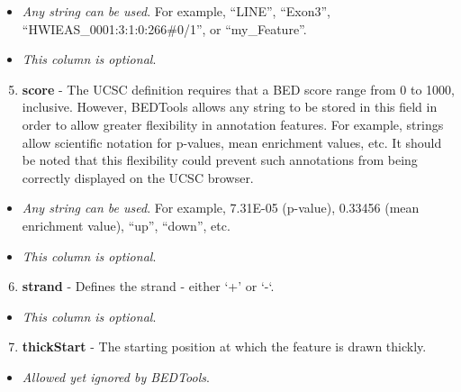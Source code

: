 \documentclass[letterpaper,10pt,english]{sphinxmanual}
\begin{document}
\begin{itemize}
\item {} 
\emph{Any string can be used}. For example, ``LINE'', ``Exon3'', ``HWIEAS\_0001:3:1:0:266\#0/1'', or ``my\_Feature''.

\item {} 
\emph{This column is optional}.

\end{itemize}
\begin{enumerate}
\setcounter{enumi}{4}
\item {} 
\textbf{score} - The UCSC definition requires that a BED score range from 0 to 1000, inclusive. However, BEDTools allows any string to be stored in this field in order to allow greater flexibility in annotation features. For example, strings allow scientific notation for p-values, mean enrichment values, etc. It should be noted that this flexibility could prevent such annotations from being correctly displayed on the UCSC browser.

\end{enumerate}
\begin{itemize}
\item {} 
\emph{Any string can be used}. For example, 7.31E-05 (p-value), 0.33456 (mean enrichment value), ``up'', ``down'', etc.

\item {} 
\emph{This column is optional}.

\end{itemize}
\begin{enumerate}
\setcounter{enumi}{5}
\item {} 
\textbf{strand} - Defines the strand - either `+' or `-`.

\end{enumerate}
\begin{itemize}
\item {} 
\emph{This column is optional}.

\end{itemize}
\begin{enumerate}
\setcounter{enumi}{6}
\item {} 
\textbf{thickStart} - The starting position at which the feature is drawn thickly.

\end{enumerate}
\begin{itemize}
\item {} 
\emph{Allowed yet ignored by BEDTools}.

\end{itemize}
\end{document}

